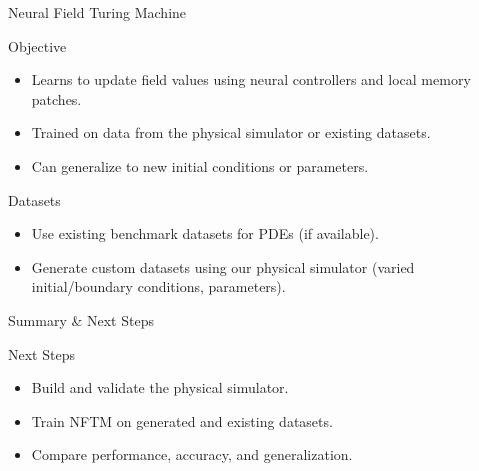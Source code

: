 \begin{secframe}
\small
\textcolor{red_unipd}{\Large Neural Field Turing Machine}

\vspace{0.6em}

\begin{alertblock}{Objective}
\begin{itemize}
  \item Learns to update field values using neural controllers and local memory patches.
  \item Trained on data from the physical simulator or existing datasets.
  \item Can generalize to new initial conditions or parameters.
\end{itemize}
\end{alertblock}

\begin{block}{Datasets}
\begin{itemize}
  \item Use existing benchmark datasets for PDEs (if available).
  \item Generate custom datasets using our physical simulator (varied initial/boundary conditions, parameters).
\end{itemize}
\end{block}
\end{secframe}


\begin{secframe}
\small
\textcolor{red_unipd}{\Large Summary \& Next Steps}

\vspace{0.6em}

\begin{block}{Next Steps}
\begin{itemize}
  \item Build and validate the physical simulator.
  \item Train NFTM on generated and existing datasets.
  \item Compare performance, accuracy, and generalization.
\end{itemize}
\end{block}
\end{secframe}
